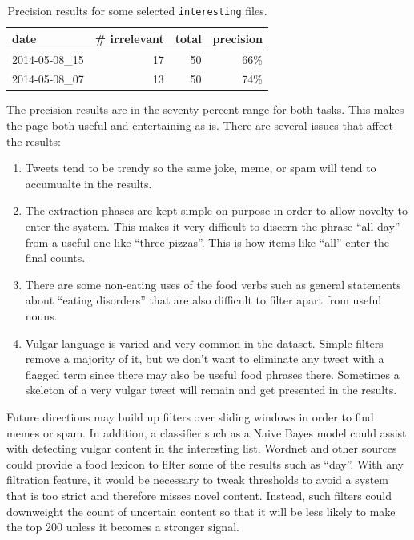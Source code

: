 \documentclass[letterpaper]{article}%
\begin{document}
\begin{table}[h]
  \centering
  \begin{tabular}{lrrr}
    \toprule
    date & \# irrelevant & total & precision \\
    \midrule
    2014-05-08\_15 & 17 & 50 & 66\% \\
    2014-05-08\_07 & 13 & 50 & 74\% \\
    \bottomrule
  \end{tabular}
  \caption{Precision results for some selected \texttt{interesting} files.}
  \label{tab:interestingPrecision}
\end{table}

The precision results are in the seventy percent range for both tasks. This
makes the page both useful and entertaining as-is. There are several issues
that affect the results:

\begin{enumerate}[i]
  \item Tweets tend to be trendy so the same joke, meme, or spam will tend to
    accumualte in the results.
  \item The extraction phases are kept simple on purpose in order to allow
    novelty to enter the system. This makes it very difficult to discern the
    phrase ``all day'' from a useful one like ``three pizzas''. This is how
    items like ``all'' enter the final counts.
  \item There are some non-eating uses of the food verbs such as general
    statements about ``eating disorders'' that are also difficult to filter
    apart from useful nouns.
  \item Vulgar language is varied and very common in the dataset. Simple
    filters remove a majority of it, but we don't want to eliminate any tweet
    with a flagged term since there may also be useful food phrases there.
    Sometimes a skeleton of a very vulgar tweet will remain and get presented
    in the results.
\end{enumerate}

Future directions may build up filters over sliding windows in order to find
memes or spam. In addition, a classifier such as a Naive Bayes model could
assist with detecting vulgar content in the interesting list. Wordnet and other
sources could provide a food lexicon to filter some of the results such as
``day''.  With any filtration feature, it would be necessary to tweak
thresholds to avoid a system that is too strict and therefore misses novel
content. Instead, such filters could downweight the count of uncertain content
so that it will be less likely to make the top 200 unless it becomes a stronger
signal.
\end{document}
